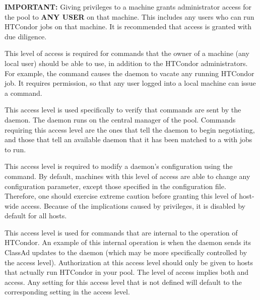 \begin{description}
   \textbf{IMPORTANT:} Giving  privileges to a machine
   grants administrator access for the pool to
   \textbf{ANY USER} on that machine. This includes any
   users who can run HTCondor jobs on that machine.
   It is recommended that  access is granted with due diligence.

\item[\DCPerm{OWNER}] \label{dcperm:owner} This level of access is
   required for commands that the owner of a machine (any local user)
   should be able to use, in addition to the HTCondor administrators.
   For example, the  command causes the
    daemon to vacate any running HTCondor job.
   It requires  permission,
   so that any user logged into a local machine
   can issue a  command.

\item[\DCPerm{NEGOTIATOR}] \label{dcperm:negotiator} This
   access level is used specifically to verify that commands are
   sent by the  daemon.
   The  daemon runs on the central manager of
   the pool.
   Commands requiring this access
   level are the ones that tell the  daemon to begin
   negotiating, and those that tell an available  daemon
   that it has been matched to a  with jobs to run.

\item[\DCPerm{CONFIG}] \label{dcperm:config} This access level is
   required to modify a daemon's configuration using
   the  command.
   By default, machines with this level of access are able
   to change any configuration parameter, except those specified in
   the  configuration file.
   Therefore, one should exercise extreme caution before
   granting this level of host-wide access.
   Because of the implications caused by  privileges,
   it is disabled by default for all hosts.

\item[\DCPerm{DAEMON}] \label{dcperm:daemon} This access level
   is used for commands that are internal to the operation of
   HTCondor.  An example of this internal operation is when the
    daemon sends
   its ClassAd updates to the  daemon (which may be
   more specifically controlled by the 
   access level).
   Authorization at this access level should only be given to
   hosts that actually run HTCondor in your pool.
   The  level of access implies both
    and  access.  Any setting for this access
   level that is not defined will default to the corresponding setting
   in the  access level.


\end{description}
